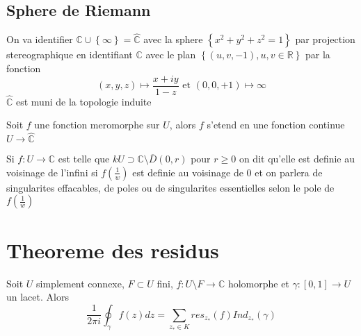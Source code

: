 \documentclass[../main.tex]{subfiles}
\begin{document}
\subsection{Sphere de Riemann}
On va identifier $ \mathbb{C}\cup \left\{ \infty  \right\} = \hat{\mathbb{C}}$ avec la sphere $ \left\{ x^{2}+y^{2}+z^{2}=1 \right\} $ par projection stereographique en identifiant $\mathbb{C}$ avec le plan $ \left\{ ( u,v,-1) , u,v \in \mathbb{R} \right\} $ par la fonction 
\[ 
	( x,y,z) \mapsto \frac{x+iy}{1-z} \text{ et } ( 0,0,+1) \mapsto \infty 
\]
$\hat{\mathbb{C}}$ est muni de la topologie induite
\begin{propo}
Soit $f$ une fonction meromorphe sur $U$, alors $f$ s'etend en une fonction continue $ U\to \hat{\mathbb{C}}$ 
\end{propo}
Si $f:U\to \mathbb{C}$ est telle que $k U \supset \mathbb{C}\setminus \overline{D}( 0,r) $ pour $r \geq 0$ on dit qu'elle est definie au voisinage de l'infini si $f( \frac{1}{w}) $ est definie au voisinage de $0$ et on parlera de singularites effacables, de poles ou de singularites essentielles selon le pole de $f( \frac{1}{w}) $ 	

\section{Theoreme des residus}
\begin{thm}

	Soit $U$ simplement connexe, $F\subset U$ fini, $f:U\setminus F \to \mathbb{C}$ holomorphe et $\gamma: [ 0,1] \to U$ un lacet. Alors
	\[ 
	\frac{1}{2\pi i}\oint_{\gamma} f( z) dz= \sum_{z_{*} \in K}^{ } res_{z_*} ( f) Ind_{z_*} ( \gamma) 
	\]
	
\end{thm}
		
\end{document}
